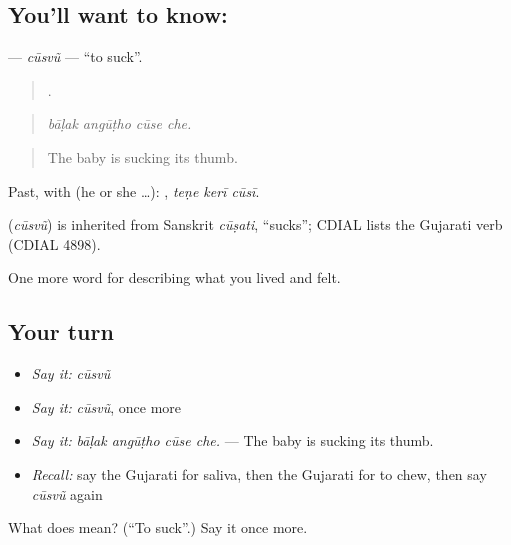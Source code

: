 \subsection*{You'll want to know: }
\textbf{} — \emph{cūsvũ} — \textquotedblleft{}to suck\textquotedblright{}.

\begin{quote}
   .
\end{quote}

\begin{quote}
\emph{bāḷak angūṭho cūse che.}
\end{quote}

\begin{quote}
The baby is sucking its thumb.
\end{quote}

Past, with  (he or she …):   , \emph{teṇe kerī cūsī}.

\begin{cousinweb}
\textbf{} (\emph{cūsvũ}) is inherited from Sanskrit \emph{cūṣati}, \textquotedblleft{}sucks\textquotedblright{}; CDIAL lists the Gujarati verb (CDIAL 4898).
\end{cousinweb}

\begin{grammarlens}[title={What you've built}]
One more word for describing what you lived and felt.
\end{grammarlens}

\subsection*{Your turn}
\begin{itemize}
\raggedright
  \item \emph{Say it:} \emph{cūsvũ}
  \item \emph{Say it:} \emph{cūsvũ}, once more
  \item \emph{Say it:} \emph{bāḷak angūṭho cūse che.} — The baby is sucking its thumb.
  \item \emph{Recall:} say the Gujarati for saliva, then the Gujarati for to chew, then say \emph{cūsvũ} again
\end{itemize}

\begin{tcolorbox}[breakable,colback=teal!4,colframe=teal!35!black,title={Before you move on}]
What does  mean? (\textquotedblleft{}To suck\textquotedblright{}.) Say it once more.
\end{tcolorbox}
